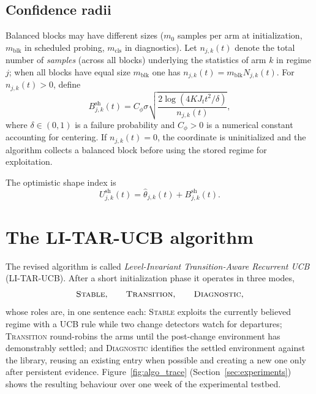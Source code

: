 \documentclass[11pt]{article}
\begin{document}
\subsection{Confidence radii}
\label{subsec:confidence_radii}

Balanced blocks may have different sizes ($m_0$ samples per arm at initialization, $m_{\mathrm{blk}}$ in scheduled probing, $m_{\mathrm{cls}}$ in diagnostics). Let $n_{j,k}(t)$ denote the total number of \emph{samples} (across all blocks) underlying the statistics of arm $k$ in regime $j$; when all blocks have equal size $m_{\mathrm{blk}}$ one has $n_{j,k}(t)=m_{\mathrm{blk}}N_{j,k}(t)$. For $n_{j,k}(t)>0$, define
\begin{equation}
\label{eq:shape_confidence_radius}
B_{j,k}^{\mathrm{sh}}(t)
=
C_{\phi}\sigma
\sqrt{
\frac{2\log(4KJ_t t^2/\delta)}{n_{j,k}(t)}
},
\end{equation}
where $\delta\in(0,1)$ is a failure probability and $C_{\phi}>0$ is a numerical constant accounting for centering. If $n_{j,k}(t)=0$, the coordinate is uninitialized and the algorithm collects a balanced block before using the stored regime for exploitation.

The optimistic shape index is
\begin{equation}
\label{eq:shape_ucb_index}
U_{j,k}^{\mathrm{sh}}(t)
=
\widehat\theta_{j,k}(t)+B_{j,k}^{\mathrm{sh}}(t).
\end{equation}

\section{The LI-TAR-UCB algorithm}
\label{sec:algorithm}

The revised algorithm is called \emph{Level-Invariant Transition-Aware Recurrent UCB} (LI-TAR-UCB). After a short initialization phase it operates in three modes,
\begin{equation}
\label{eq:modes}
\textsc{Stable},
\qquad
\textsc{Transition},
\qquad
\textsc{Diagnostic},
\end{equation}
whose roles are, in one sentence each: \textsc{Stable} exploits the currently believed regime with a UCB rule while two change detectors watch for departures; \textsc{Transition} round-robins the arms until the post-change environment has demonstrably settled; and \textsc{Diagnostic} identifies the settled environment against the library, reusing an existing entry when possible and creating a new one only after persistent evidence. Figure~\ref{fig:algo_trace} (Section~\ref{sec:experiments}) shows the resulting behaviour over one week of the experimental testbed.
\end{document}
